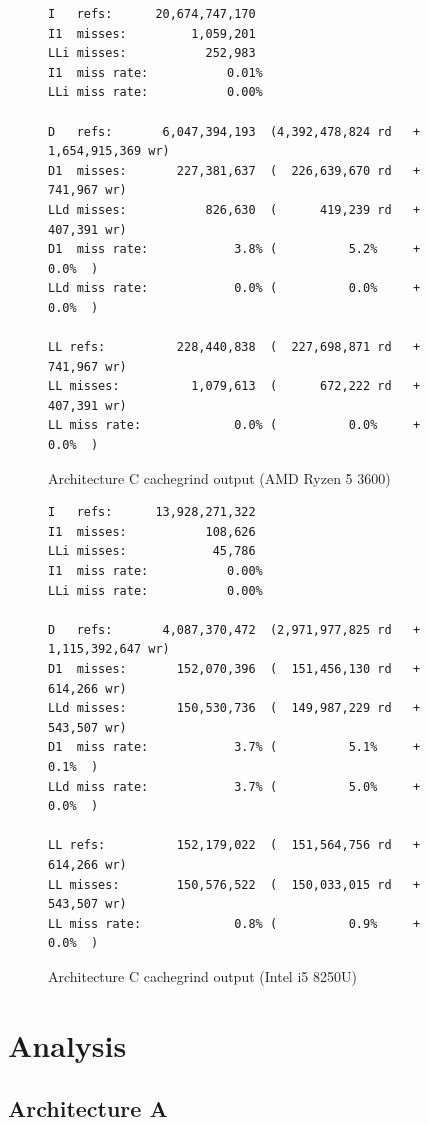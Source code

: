 \documentclass{article}
\begin{document}
\begin{figure}[!h]
\centering
\begin{BVerbatim}
I   refs:      20,674,747,170
I1  misses:         1,059,201
LLi misses:           252,983
I1  miss rate:           0.01%
LLi miss rate:           0.00%

D   refs:       6,047,394,193  (4,392,478,824 rd   + 1,654,915,369 wr)
D1  misses:       227,381,637  (  226,639,670 rd   +       741,967 wr)
LLd misses:           826,630  (      419,239 rd   +       407,391 wr)
D1  miss rate:            3.8% (          5.2%     +           0.0%  )
LLd miss rate:            0.0% (          0.0%     +           0.0%  )

LL refs:          228,440,838  (  227,698,871 rd   +       741,967 wr)
LL misses:          1,079,613  (      672,222 rd   +       407,391 wr)
LL miss rate:             0.0% (          0.0%     +           0.0%  )
\end{BVerbatim}
\caption{Architecture C cachegrind output (AMD Ryzen 5 3600)}
\label{arch_c_cachegrind_pc}
\end{figure}

\begin{figure}[!h]
\centering
\begin{BVerbatim}
I   refs:      13,928,271,322
I1  misses:           108,626
LLi misses:            45,786
I1  miss rate:           0.00%
LLi miss rate:           0.00%

D   refs:       4,087,370,472  (2,971,977,825 rd   + 1,115,392,647 wr)
D1  misses:       152,070,396  (  151,456,130 rd   +       614,266 wr)
LLd misses:       150,530,736  (  149,987,229 rd   +       543,507 wr)
D1  miss rate:            3.7% (          5.1%     +           0.1%  )
LLd miss rate:            3.7% (          5.0%     +           0.0%  )

LL refs:          152,179,022  (  151,564,756 rd   +       614,266 wr)
LL misses:        150,576,522  (  150,033,015 rd   +       543,507 wr)
LL miss rate:             0.8% (          0.9%     +           0.0%  )
\end{BVerbatim}
\caption{Architecture C cachegrind output (Intel i5 8250U)}
\label{arch_c_cachegrind_laptop}
\end{figure}

\clearpage

\section{Analysis}
\subsection{Architecture A}
\end{document}
